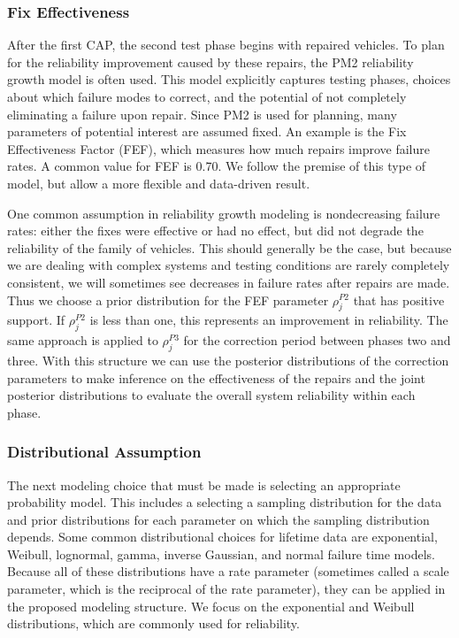\documentclass[12pt]{article}
\begin{document}
\subsubsection{Fix Effectiveness}\label{FEF}
After the first CAP, the second test phase begins with repaired vehicles. To plan for the reliability improvement caused by
these repairs, the PM2 reliability growth model \cite{ref2} is often used.
This model explicitly captures testing phases, choices about which failure modes
to correct, and the potential of not completely eliminating a failure upon
repair. Since PM2 is used for planning, many parameters of potential
interest are assumed fixed. An example is the Fix Effectiveness Factor (FEF), which measures how much
repairs improve failure rates. A common value for FEF is
0.70. We follow the premise of this type of model, but allow a more flexible and
data-driven result.

One common assumption in reliability growth modeling is nondecreasing
failure rates: either the fixes were effective or had no effect, but did
not degrade the reliability of the family of vehicles.  This should generally be the case, but
because we are dealing with complex systems and testing conditions are rarely
completely consistent, we will sometimes see decreases in failure rates after repairs are made.  Thus we choose a prior distribution for the
FEF parameter $\rho_{j}^{P2}$ that has positive support.  If
$\rho_{j}^{P2}$ is less than one, this represents an improvement in reliability.
The same approach is applied to $\rho_{j}^{P3}$ for the correction period
between phases two and three.  With this structure we can use the posterior
distributions of the correction parameters to make inference on the effectiveness
of the repairs and the joint posterior distributions to evaluate the overall system reliability within each phase.

\subsubsection{Distributional Assumption}
The next modeling choice that must be made is selecting an appropriate
probability model. This includes a selecting a sampling distribution for the data
and prior distributions for each parameter on which the sampling distribution
depends. Some common distributional choices for lifetime data are exponential, Weibull, lognormal, gamma, inverse
Gaussian, and normal failure time models.  Because all of these distributions
have a rate parameter (sometimes called a scale parameter, which is the reciprocal of the rate parameter), they can be applied in
the proposed modeling structure. We focus on the
exponential and Weibull distributions, which are commonly used for reliability.
\end{document}
